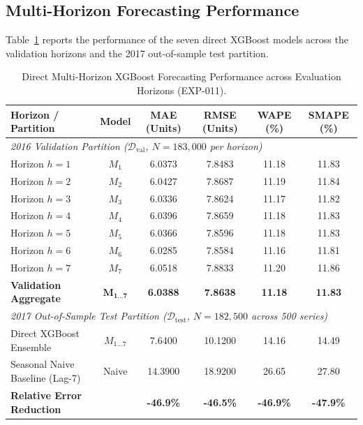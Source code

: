 \documentclass[11pt,a4paper]{article}
\begin{document}
\subsection{Multi-Horizon Forecasting Performance}
\label{sec:res_forecasting}
Table~\ref{tab:forecasting_results} reports the performance of the seven direct XGBoost models across the validation horizons and the 2017 out-of-sample test partition.

\begin{table}[htbp]
\centering
\small
\caption{Direct Multi-Horizon XGBoost Forecasting Performance across Evaluation Horizons (EXP-011).}
\label{tab:forecasting_results}
\begin{tabular}{lccccc}
\toprule
\textbf{Horizon / Partition} & \textbf{Model} & \textbf{MAE (Units)} & \textbf{RMSE (Units)} & \textbf{WAPE (\%)} & \textbf{SMAPE (\%)} \\
\midrule
\multicolumn{6}{l}{\textit{2016 Validation Partition ($\mathcal{D}_{\text{val}}$, $N=183,000$ per horizon)}} \\
Horizon $h=1$ & $M_1$ & 6.0373 & 7.8483 & 11.18 & 11.83 \\
Horizon $h=2$ & $M_2$ & 6.0427 & 7.8687 & 11.19 & 11.84 \\
Horizon $h=3$ & $M_3$ & 6.0336 & 7.8624 & 11.17 & 11.82 \\
Horizon $h=4$ & $M_4$ & 6.0396 & 7.8659 & 11.18 & 11.83 \\
Horizon $h=5$ & $M_5$ & 6.0366 & 7.8596 & 11.18 & 11.83 \\
Horizon $h=6$ & $M_6$ & 6.0285 & 7.8584 & 11.16 & 11.81 \\
Horizon $h=7$ & $M_7$ & 6.0518 & 7.8833 & 11.20 & 11.86 \\
\textbf{Validation Aggregate} & $\mathbf{M_{1\dots7}}$ & \textbf{6.0388} & \textbf{7.8638} & \textbf{11.18} & \textbf{11.83} \\
\midrule
\multicolumn{6}{l}{\textit{2017 Out-of-Sample Test Partition ($\mathcal{D}_{\text{test}}$, $N=182,500$ across 500 series)}} \\
Direct XGBoost Ensemble & $M_{1\dots7}$ & 7.6400 & 10.1200 & 14.16 & 14.49 \\
Seasonal Naive Baseline (Lag-7) & Naive & 14.3900 & 18.9200 & 26.65 & 27.80 \\
\textbf{Relative Error Reduction} & & \textbf{-46.9\%} & \textbf{-46.5\%} & \textbf{-46.9\%} & \textbf{-47.9\%} \\
\bottomrule
\end{tabular}
\end{table}
\end{document}
